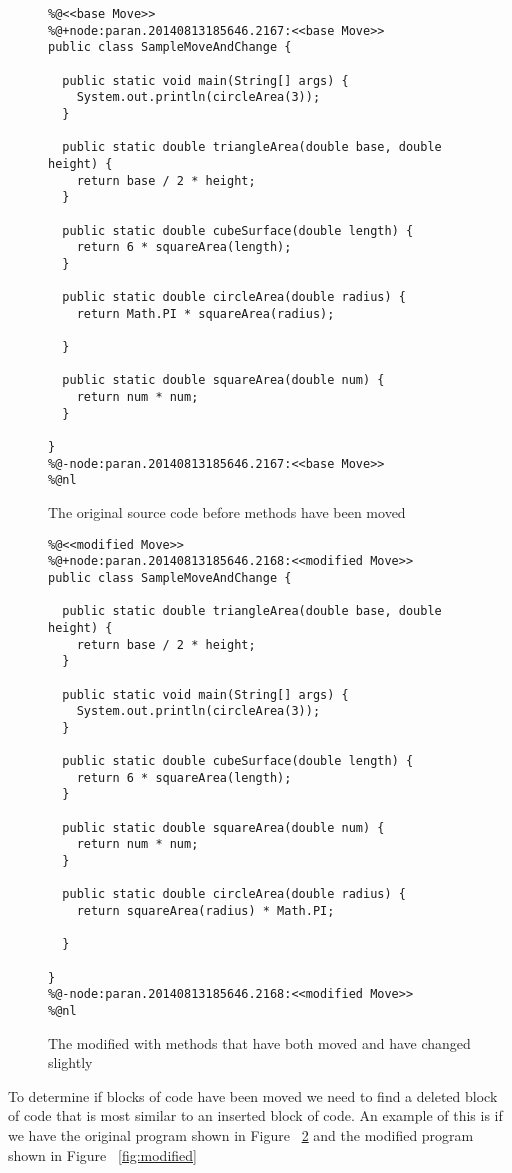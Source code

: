\begin{figure}[!t]
\begin{lstlisting}
%@<<base Move>>
%@+node:paran.20140813185646.2167:<<base Move>>
public class SampleMoveAndChange {

  public static void main(String[] args) {
    System.out.println(circleArea(3));
  }

  public static double triangleArea(double base, double height) {
    return base / 2 * height;
  }

  public static double cubeSurface(double length) {
    return 6 * squareArea(length);
  }

  public static double circleArea(double radius) {
    return Math.PI * squareArea(radius);

  }

  public static double squareArea(double num) {
    return num * num;
  }

}
%@-node:paran.20140813185646.2167:<<base Move>>
%@nl
\end{lstlisting}
\caption{The original source code before methods have been moved}
 \label{fig:orig}
\end{figure}

\begin{figure}[!t]
\begin{lstlisting}
%@<<modified Move>>
%@+node:paran.20140813185646.2168:<<modified Move>>
public class SampleMoveAndChange {

  public static double triangleArea(double base, double height) {
    return base / 2 * height;
  }

  public static void main(String[] args) {
    System.out.println(circleArea(3));
  }

  public static double cubeSurface(double length) {
    return 6 * squareArea(length);
  }

  public static double squareArea(double num) {
    return num * num;
  }

  public static double circleArea(double radius) {
    return squareArea(radius) * Math.PI;

  }

}
%@-node:paran.20140813185646.2168:<<modified Move>>
%@nl
\end{lstlisting}
\caption{The modified with methods that have both moved and have changed slightly}
 \label{fig:orig}
\end{figure}


To determine if blocks of code have been moved we need to find a deleted block of code that is most similar to an inserted block of code.  An example of this is if we have the original program shown in Figure ~\ref{fig:orig} and the modified program shown in Figure ~\ref{fig:modified}

